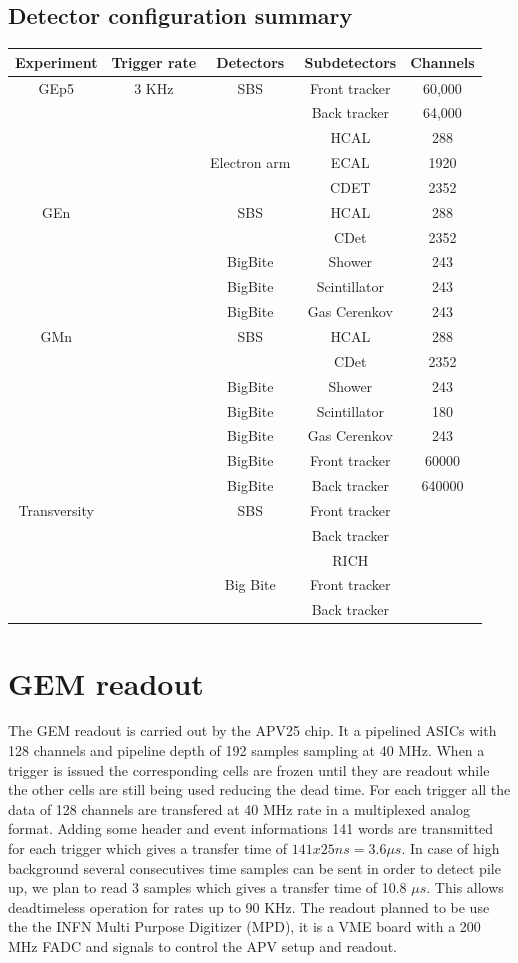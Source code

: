\documentclass{article}
\begin{document}
\subsection{Detector configuration summary}
\begin{tabular}{|c|c|c|c|c|}
\hline
Experiment&Trigger rate & Detectors & Subdetectors & Channels\\
\hline
GEp5& 3 KHz  & SBS & Front tracker & 60,000\\ 
 && & Back tracker & 64,000\\
 && & HCAL & 288\\
 & & Electron arm& ECAL & 1920 \\ 
 &&              & CDET & 2352 \\ 
\hline
GEn& & SBS & HCAL & 288 \\ 
 &    &   & CDet & 2352 \\ 
 && BigBite& Shower & 243\\ 
 && BigBite& Scintillator & 243\\ 
 && BigBite& Gas Cerenkov & 243\\ 
\hline
GMn& & SBS & HCAL & 288 \\ 
   &  &   & CDet & 2352 \\ 
 && BigBite& Shower & 243\\ 
 && BigBite& Scintillator & 180\\ 
 && BigBite& Gas Cerenkov & 243\\ 
 && BigBite& Front tracker & 60000\\ 
 && BigBite& Back tracker & 640000\\ 
\hline
Transversity && SBS & Front tracker & \\
 &&  & Back tracker & \\
 &&  & RICH & \\
 && Big Bite & Front tracker & \\
 &&  & Back tracker & \\

\end{tabular}


\section{GEM readout}
The GEM readout is carried out by the APV25 chip. It a pipelined ASICs with 128 channels and pipeline depth of 192 samples sampling at 40 MHz. When a trigger is issued the corresponding cells are frozen until they are readout while the other cells are still being used reducing the dead time.
For each trigger all the data of 128 channels are transfered at 40 MHz rate in a multiplexed analog format. Adding some header and event informations 141 words are transmitted for each trigger which gives a transfer time of $141x25 ns = 3.6 \mu s $. In case of high background several consecutives time samples can be sent in order to detect pile up, we plan to read 3 samples which gives a transfer time of 10.8 $\mu s$. This allows deadtimeless operation for rates up to 90 KHz. The readout planned to be use the the INFN Multi Purpose Digitizer (MPD), it is a VME board with a 200 MHz FADC and signals to control the APV setup and readout. 
\end{document}
